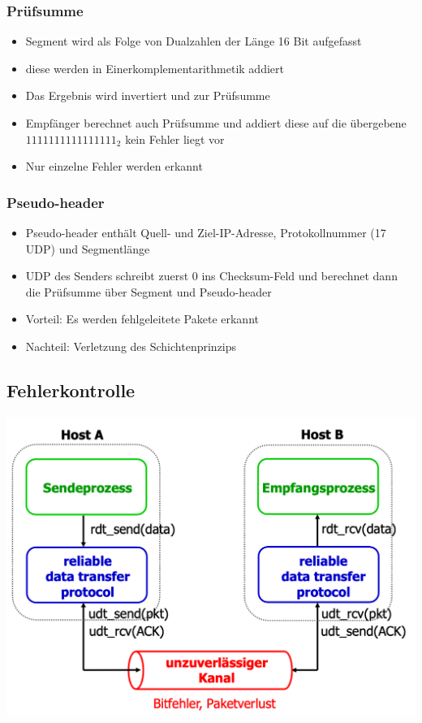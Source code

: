 \subsubsection{Prüfsumme}
\begin{itemize}
	\item Segment wird als Folge von Dualzahlen der Länge 16 Bit aufgefasst
	\item diese werden in Einerkomplementarithmetik addiert
	\item Das Ergebnis wird invertiert und zur Prüfsumme
	\item Empfänger berechnet auch Prüfsumme und addiert diese auf die übergebene \rightarrow $1111111111111111_2$ \Rightarrow kein Fehler liegt vor
	\item Nur einzelne Fehler werden erkannt
\end{itemize}
\subsubsection{Pseudo-header}
\begin{itemize}
	\item Pseudo-header enthält Quell- und Ziel-IP-Adresse, Protokollnummer (17 UDP) und Segmentlänge
	\item UDP des Senders schreibt zuerst 0 ins Checksum-Feld und berechnet dann die Prüfsumme über Segment und Pseudo-header
	\item Vorteil: Es werden fehlgeleitete Pakete erkannt
	\item Nachteil: Verletzung des Schichtenprinzips 
\end{itemize}
\subsection{Fehlerkontrolle}
\begin{center}
	\includegraphics[scale=0.125]{images/Fehlerkontrolle.png}
\end{center}
